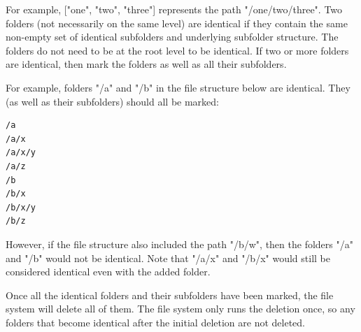 \documentclass[9pt, b5paper]{article}
\begin{document}
For example, ["one", "two", "three"] represents the path "/one/two/three".
Two folders (not necessarily on the same level) are identical if they contain the same non-empty set of identical subfolders and underlying subfolder structure. The folders do not need to be at the root level to be identical. If two or more folders are identical, then mark the folders as well as all their subfolders.

For example, folders "/a" and "/b" in the file structure below are identical. They (as well as their subfolders) should all be marked:
\begin{verbatim}
/a
/a/x
/a/x/y
/a/z
/b
/b/x
/b/x/y
/b/z
\end{verbatim}
However, if the file structure also included the path "/b/w", then the folders "/a" and "/b" would not be identical. Note that "/a/x" and "/b/x" would still be considered identical even with the added folder.

Once all the identical folders and their subfolders have been marked, the file system will delete all of them. The file system only runs the deletion once, so any folders that become identical after the initial deletion are not deleted.
\end{document}
